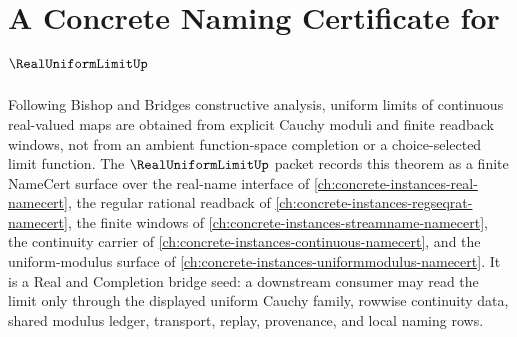 \chapter{A Concrete Naming Certificate for $\RealUniformLimitUp$}
\label{ch:concrete-instances-real-uniform-limit-namecert}

Following Bishop and Bridges constructive analysis, uniform limits of continuous real-valued maps are obtained from explicit Cauchy moduli and finite readback windows, not from an ambient function-space completion or a choice-selected limit function. The $\RealUniformLimitUp$ packet records this theorem as a finite NameCert surface over the real-name interface of \autoref{ch:concrete-instances-real-namecert}, the regular rational readback of \autoref{ch:concrete-instances-regseqrat-namecert}, the finite windows of \autoref{ch:concrete-instances-streamname-namecert}, the continuity carrier of \autoref{ch:concrete-instances-continuous-namecert}, and the uniform-modulus surface of \autoref{ch:concrete-instances-uniformmodulus-namecert}. It is a Real and Completion bridge seed: a downstream consumer may read the limit only through the displayed uniform Cauchy family, rowwise continuity data, shared modulus ledger, transport, replay, provenance, and local naming rows.

